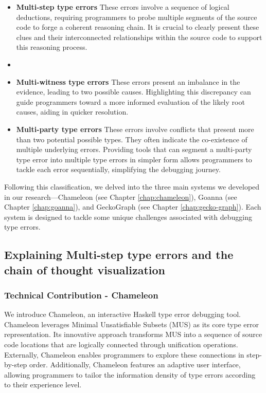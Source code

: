 \begin{itemize}
    \item {\textbf{Multi-step type errors} These errors involve a sequence of logical deductions, requiring programmers to probe multiple segments of the source code to forge a coherent reasoning chain. It is crucial to clearly present these clues and their interconnected relationships within the source code to support this reasoning process.}
    \item 
    \item{\textbf{Multi-witness type errors}  These errors present an imbalance in the evidence, leading to two possible causes. Highlighting this discrepancy can guide programmers toward a more informed evaluation of the likely root causes, aiding in quicker resolution.}
    \item{\textbf{Multi-party type errors} These errors involve conflicts that present more than two potential possible types. They often indicate the co-existence of multiple underlying errors. Providing tools that can segment a multi-party type error into multiple type errors in simpler form allows programmers to tackle each error sequentially, simplifying the debugging journey.}
\end{itemize}


Following this classification, we delved into the three main systems we developed in our research—Chameleon (see Chapter \ref{chap:chameleon}), Goanna (see Chapter \ref{chap:goanna}), and GeckoGraph (see Chapter \ref{chap:gecko-graph}). Each system is designed to tackle some unique challenges associated with debugging type errors.

\subsection{Explaining Multi-step type errors and the chain of thought visualization}

\subsubsection{Technical Contribution - Chameleon}
We introduce Chameleon, an interactive Haskell type error debugging tool. Chameleon leverages Minimal Unsatisfiable Subsets (MUS) as its core type error representation. Its innovative approach transforms MUS into a sequence of source code locations that are logically connected through unification operations. Externally, Chameleon enables programmers to explore these connections in step-by-step order. Additionally, Chameleon features an adaptive user interface, allowing programmers to tailor the information density of type errors according to their experience level.


